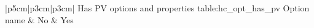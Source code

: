 \begin{customLongTable}{ |p{5cm}|p{3cm}|p{3cm}| }
{Has PV options and properties} {table:hc_opt_has_pv}
{Option name & No & Yes}
\endhead
\hline
\end{customLongTable}
